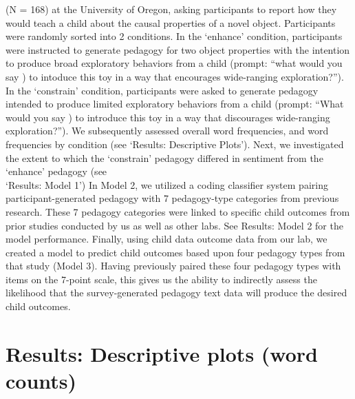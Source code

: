 \documentclass[
  english,
  man]{apa6}
\begin{document}
(N = 168) at the University of Oregon, asking participants to report how they
would teach a child about the causal properties of a novel object. Participants
were randomly sorted into 2 conditions. In the `enhance' condition, participants
were instructed to generate pedagogy for two object properties with the intention
to produce broad exploratory behaviors from a child (prompt: ``what would you say )
to intoduce this toy in a way that encourages wide-ranging exploration?''). In the
`constrain' condition, participants were asked to generate pedagogy intended to
produce limited exploratory behaviors from a child (prompt: ``What would you say )
to introduce this toy in a way that discourages wide-ranging exploration?''). We
subsequently assessed overall word frequencies, and word frequencies by condition
(see `Results: Descriptive Plots'). Next, we investigated the extent to which the
`constrain' pedagogy differed in sentiment from the `enhance' pedagogy (see\\
`Results: Model 1')
In Model 2, we utilized a coding classifier system pairing
participant-generated pedagogy with 7 pedagogy-type categories from previous
research. These 7 pedagogy categories were linked to specific child outcomes from
prior studies conducted by us as well as other labs. See Results: Model 2 for the
model performance. Finally, using child data outcome data from our lab, we created
a model to predict child outcomes based upon four pedagogy types from that study
(Model 3). Having previously paired these four pedagogy types with items on the
7-point scale, this gives us the ability to indirectly assess the likelihood that
the survey-generated pedagogy text data will produce the desired child outcomes.

\hypertarget{results-descriptive-plots-word-counts}{%
\section{Results: Descriptive plots (word counts)}\label{results-descriptive-plots-word-counts}}
\end{document}
